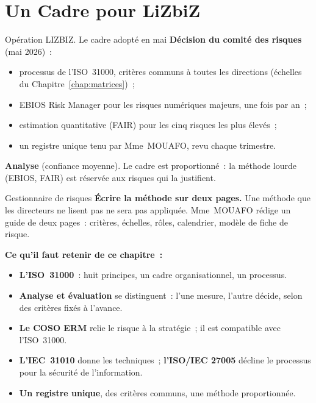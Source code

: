 \section{Un Cadre pour LiZbiZ}
\label{sec:c04-lizbiz}

\begin{boxscenario}{Opération LIZBIZ. Le cadre adopté en mai}
\textbf{Décision du comité des risques} (mai 2026)~:
\begin{itemize}
    \item processus de l'ISO~31000, critères communs à toutes les
          directions (échelles du Chapitre~\ref{chap:matrices})~;
    \item EBIOS Risk Manager pour les risques numériques majeurs, une fois
          par an~;
    \item estimation quantitative (FAIR) pour les cinq risques les plus
          élevés~;
    \item un registre unique tenu par Mme~MOUAFO, revu chaque trimestre.
\end{itemize}

\medskip
\textbf{Analyse} (confiance moyenne). Le cadre est proportionné~: la
méthode lourde (EBIOS, FAIR) est réservée aux risques qui la justifient.
\end{boxscenario}

\begin{boxmetier}{Gestionnaire de risques}
\textbf{Écrire la méthode sur deux pages.} Une méthode que les directeurs
ne lisent pas ne sera pas appliquée. Mme~MOUAFO rédige un guide de deux
pages~: critères, échelles, rôles, calendrier, modèle de fiche de risque.
\end{boxmetier}

\separateur

\begin{boxresume}
\textbf{Ce qu'il faut retenir de ce chapitre~:}
\begin{itemize}
    \item \textbf{L'ISO~31000}~: huit principes, un cadre organisationnel,
          un processus.
    \item \textbf{Analyse et évaluation} se distinguent~: l'une mesure,
          l'autre décide, selon des critères fixés à l'avance.
    \item \textbf{Le COSO ERM} relie le risque à la stratégie~; il est
          compatible avec l'ISO~31000.
    \item \textbf{L'IEC~31010} donne les techniques~; \textbf{l'ISO/IEC
          27005} décline le processus pour la sécurité de l'information.
    \item \textbf{Un registre unique}, des critères communs, une méthode
          proportionnée.
\end{itemize}
\end{boxresume}

